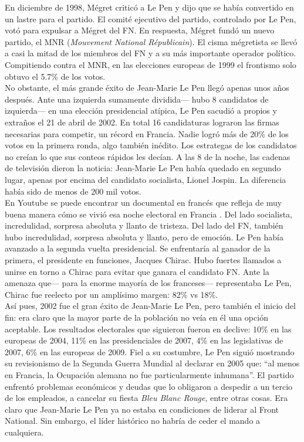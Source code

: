 En diciembre de 1998, Mégret criticó a Le Pen y dijo que se había convertido en un lastre para el partido. El comité ejecutivo del partido, controlado por Le Pen, votó para expulsar a Mégret del FN. En respuesta, Mégret fundó un nuevo partido, el MNR (\textit{Mouvement National Républicain}). El cisma mégretista se llevó a casi la mitad de los miembros del FN y a su más importante operador político. Compitiendo contra el MNR, en las elecciones europeas de 1999 el frontismo solo obtuvo el 5.7\% de los votos.\\ 

No obstante, el más grande éxito de Jean-Marie Le Pen llegó apenas unos años después. Ante una izquierda sumamente dividida--- hubo 8 candidatos de izquierda--- en una elección presidencial atípica, Le Pen sacudió a propios y extraños el 21 de abril de 2002. En total 16 candidaturas lograron las firmas necesarias para competir, un récord en Francia. Nadie logró más de 20\% de los votos en la primera ronda, algo también inédito. Los estrategas de los candidatos no creían lo que sus conteos rápidos les decían. A las 8 de la noche, las cadenas de televisión dieron la noticia: Jean-Marie Le Pen había quedado en segundo lugar, apenas por encima del candidato socialista, Lionel Jospin. La diferencia había sido de menos de 200 mil votos.\\ 

En Youtube se puede encontrar un documental en francés que refleja de muy buena manera cómo se vivió esa noche electoral en Francia \parencite{Capo17}. Del lado socialista, incredulidad, sorpresa absoluta y llanto de tristeza. Del lado del FN, también hubo incredulidad, sorpresa absoluta y llanto, pero de emoción. Le Pen había avanzado a la segunda vuelta presidencial. Se enfrentaría al ganador de la primera, el presidente en funciones, Jacques Chirac. Hubo fuertes llamados a unirse en torno a Chirac para evitar que ganara el candidato FN. Ante la amenaza que--- para la enorme mayoría de los franceses--- representaba Le Pen, Chirac fue reelecto por un amplísimo margen: 82\% vs 18\%.\\

Así pues, 2002 fue el gran éxito de Jean-Marie Le Pen, pero también el inicio del fin: era claro que la mayor parte de la población no veía en él una opción aceptable. Los resultados electorales que siguieron fueron en declive: 10\% en las europeas de 2004, 11\% en las presidenciales de 2007, 4\% en las legislativas de 2007, 6\% en las europeas de 2009. Fiel a su costumbre, Le Pen siguió mostrando su revisionismo de la Segunda Guerra Mundial al declarar en 2005 que: ``al menos en Francia, la Ocupación alemana no fue particularmente inhumana''. El partido enfrentó problemas económicos y deudas que lo obligaron a despedir a un tercio de los empleados, a cancelar su fiesta \textit{Bleu Blanc Rouge}, entre otras cosas. Era claro que Jean-Marie Le Pen ya no estaba en condiciones de liderar al Front National. Sin embargo, el líder histórico no habría de ceder el mando a cualquiera.

